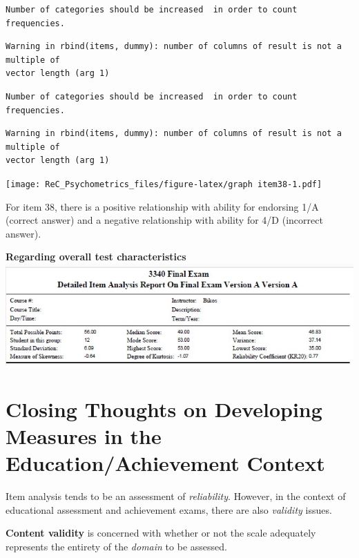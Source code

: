 \documentclass[
  english,
]{book}
\begin{document}
\begin{verbatim}
Number of categories should be increased  in order to count frequencies. 
\end{verbatim}

\begin{verbatim}
Warning in rbind(items, dummy): number of columns of result is not a multiple of
vector length (arg 1)
\end{verbatim}

\begin{verbatim}
Number of categories should be increased  in order to count frequencies. 
\end{verbatim}

\begin{verbatim}
Warning in rbind(items, dummy): number of columns of result is not a multiple of
vector length (arg 1)
\end{verbatim}

\texttt{[image: ReC\_Psychometrics\_files/figure-latex/graph item38-1.pdf]}

For item 38, there is a positive relationship with ability for endorsing 1/A (correct answer) and a negative relationship with ability for 4/D (incorrect answer).

\textbf{Regarding overall test characteristics}
\includegraphics{images/ItemAnalExam/examheader.jpg}

\hypertarget{closing-thoughts-on-developing-measures-in-the-educationachievement-context}{%
\section{Closing Thoughts on Developing Measures in the Education/Achievement Context}\label{closing-thoughts-on-developing-measures-in-the-educationachievement-context}}

Item analysis tends to be an assessment of \emph{reliability}. However, in the context of educational assessment and achievement exams, there are also \emph{validity} issues.

\textbf{Content validity} is concerned with whether or not the scale adequately represents the entirety of the \emph{domain} to be assessed.
\end{document}
